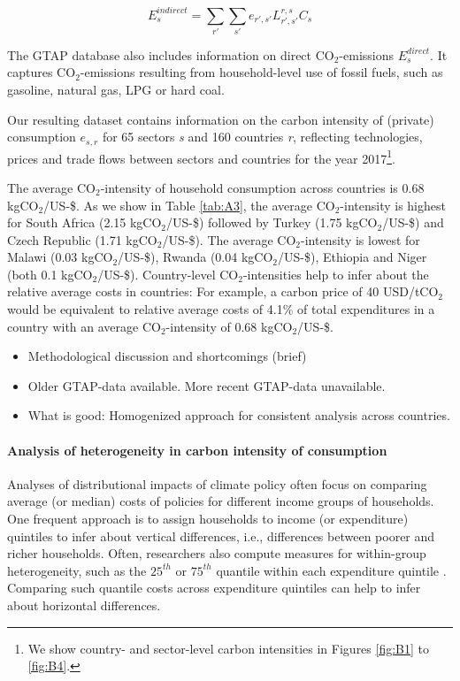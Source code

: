 \documentclass[12pt, a4paper]{article}
\begin{document}
\begin{equation}
    E_{s}^{indirect} = \sum_{r'} \sum_{s'} e_{r',s'} L_{r',s'}^{r,s} C_{s}
\end{equation}

The GTAP database also includes information on direct CO$_{2}$-emissions $E_{s}^{direct}$. It captures CO$_{2}$-emissions resulting from household-level use of fossil fuels, such as gasoline, natural gas, LPG or hard coal.

Our resulting dataset contains information on the carbon intensity of (private) consumption $e_{s,r}$ for 65 sectors \textit{s} and 160 countries \textit{r}, reflecting technologies, prices and trade flows between sectors and countries for the year 2017\footnote{We show country- and sector-level carbon intensities in Figures \ref{fig:B1} to \ref{fig:B4}.}.


The average CO$_{2}$-intensity of household consumption across countries is 0.68 kgCO$_{2}$/US-\$. As we show in Table \ref{tab:A3}, the average CO$_{2}$-intensity is highest for South Africa (2.15 kgCO$_{2}$/US-\$) followed by Turkey (1.75 kgCO$_{2}$/US-\$) and Czech Republic (1.71 kgCO$_{2}$/US-\$). The average CO$_{2}$-intensity is lowest for Malawi (0.03 kgCO$_{2}$/US-\$), Rwanda (0.04 kgCO$_{2}$/US-\$), Ethiopia and Niger (both 0.1 kgCO$_{2}$/US-\$). Country-level CO$_{2}$-intensities help to infer about the relative average costs in countries: For example, a carbon price of 40 USD/tCO$_{2}$ \autocite{Stiglitz.2017} would be equivalent to relative average costs of 4.1\% of total expenditures in a country with an average CO$_{2}$-intensity of 0.68 kgCO$_{2}$/US-\$.

\begin{itemize}
    \item Methodological discussion and shortcomings (brief)
    \item Older GTAP-data available. More recent GTAP-data unavailable.
    \item What is good: Homogenized approach for consistent analysis across countries.
\end{itemize}

\paragraph{Analysis of heterogeneity in carbon intensity of consumption}



Analyses of distributional impacts of climate policy often focus on comparing average (or median) costs of policies for different income groups of households. One frequent approach is to assign households to income (or expenditure) quintiles to infer about vertical differences, i.e., differences between poorer and richer households. Often, researchers also compute measures for within-group heterogeneity, such as the $25^{th}$ or $75^{th}$ quantile within each expenditure quintile \autocite{Cronin.2019, Missbach.2023b}. Comparing such quantile costs across expenditure quintiles can help to infer about horizontal differences.
\end{document}
